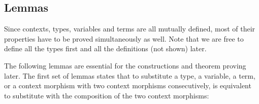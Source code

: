 \begin{code}\>\<%
\\
\>  \<%
\\
\>[0]\<[2]%
\>[2] \<[7]%
\>[7]\AgdaSymbol{:}  \AgdaSymbol{(} \AgdaInductiveConstructor{,} \AgdaInductiveConstructor{*}\AgdaSymbol{)}\<%
\\
\>[0]\<[2]%
\>[2] \<[7]%
\>[7]\AgdaSymbol{:} \AgdaSymbol{\}}     \AgdaSymbol{\{} \AgdaSymbol{:}  \AgdaSymbol{\}(} \AgdaSymbol{:}  \AgdaSymbol{)} \<[50]%
\>[50]\<%
\\
\>[2]\<[7]%
\>[7]  \AgdaSymbol{(} \AgdaInductiveConstructor{,}  \AgdaInductiveConstructor{,} \AgdaSymbol{(} \AgdaSymbol{(} \AgdaSymbol{)}   \AgdaSymbol{))} \<[54]%
\>[54]\<%
\\
\>\<\end{code}

\subsection{Lemmas}

Since contexts, types, variables and
terms are all mutually defined, most of their properties have to
be proved simultaneously as well. Note that we are free to define all the
types first and all the definitions (not shown) later. 

The following lemmas are essential for the constructions and theorem
proving later.  The first set of lemmas states that to substitute a
type, a variable, a term, or a context morphism with two context
morphisms consecutively, is equivalent to substitute with the
composition of the two context morphisms:

